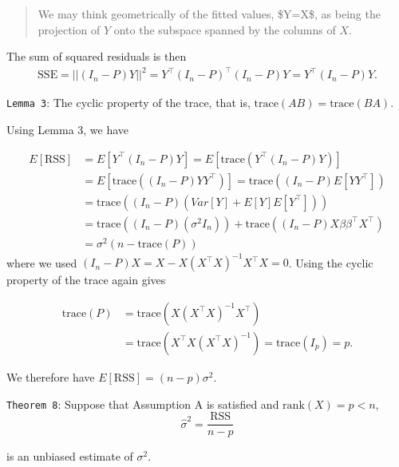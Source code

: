 \documentclass[]{article}
\begin{document}
\begin{quote}
We may think geometrically of the fitted values, \$\hat Y=X\hat\beta \$,
as being the projection of \(Y\) onto the subspace spanned by the
columns of \(X\).
\end{quote}

The sum of squared residuals is then \[
\begin{align}
\mathrm{SSE} = ||(I_n-P)Y||^2 = Y^\top(I_n-P)^\top(I_n-P)Y=Y^\top(I_n-P)Y.
\end{align}
\]

\texttt{Lemma\ 3}: The cyclic property of the trace, that is,
\(\mathrm{trace}(AB)=\mathrm{trace}(BA)\).

Using Lemma 3, we have

\[
\begin{align}
E[\mathrm{RSS}]&= E[Y^\top(I_n-P)Y]=E[\mathrm{trace}(Y^\top(I_n-P)Y)] \\&= E[\mathrm{trace}((I_n-P)YY^\top)]=\mathrm{trace}((I_n-P)E[YY^\top])\\
&=\mathrm{trace}((I_n-P)(Var[Y]+E[Y]E[Y^\top]))\\
&=\mathrm{trace}((I_n-P)(\sigma^2 I_n))+\mathrm{trace}((I_n-P)X\beta\beta^\top X^\top)\\
&=\sigma^2(n-\mathrm{trace}(P))
\end{align}
\] where we used \((I_n-P)X=X-X(X^\top X)^{-1}X^\top X=0\). Using the
cyclic property of the trace again gives

\[
\begin{align}
\mathrm{trace}(P)&= \mathrm{trace}(X(X^\top X)^{-1}X^\top)\\
&=\mathrm{trace}(X^\top X(X^\top X)^{-1})=\mathrm{trace}(I_p)=p.
\end{align}
\]

We therefore have \(E[\mathrm{RSS}]=(n-p)\sigma^2\).

\texttt{Theorem\ 8}: Suppose that Assumption A is satisfied and
\(\mathrm{rank}(X)=p<n\), \[\hat\sigma^2 = \frac{\mathrm{RSS}}{n-p}\]

is an unbiased estimate of \(\sigma^2\).
\end{document}
